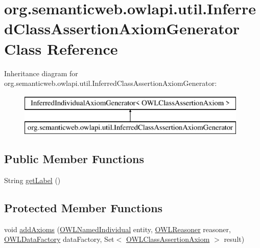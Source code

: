 \hypertarget{classorg_1_1semanticweb_1_1owlapi_1_1util_1_1_inferred_class_assertion_axiom_generator}{\section{org.\-semanticweb.\-owlapi.\-util.\-Inferred\-Class\-Assertion\-Axiom\-Generator Class Reference}
\label{classorg_1_1semanticweb_1_1owlapi_1_1util_1_1_inferred_class_assertion_axiom_generator}
}
Inheritance diagram for org.\-semanticweb.\-owlapi.\-util.\-Inferred\-Class\-Assertion\-Axiom\-Generator\-:\begin{figure}[H]
\begin{center}
\leavevmode
\includegraphics[height=2.000000cm]{classorg_1_1semanticweb_1_1owlapi_1_1util_1_1_inferred_class_assertion_axiom_generator}
\end{center}
\end{figure}
\subsection*{Public Member Functions}
\begin{DoxyCompactItemize}
\item 
String \hyperlink{classorg_1_1semanticweb_1_1owlapi_1_1util_1_1_inferred_class_assertion_axiom_generator_a949955b68387aba2d5710dfb4ddf00c2}{get\-Label} ()
\end{DoxyCompactItemize}
\subsection*{Protected Member Functions}
\begin{DoxyCompactItemize}
\item 
void \hyperlink{classorg_1_1semanticweb_1_1owlapi_1_1util_1_1_inferred_class_assertion_axiom_generator_ade39dfb7653eadb40d99926ed49cfff0}{add\-Axioms} (\hyperlink{interfaceorg_1_1semanticweb_1_1owlapi_1_1model_1_1_o_w_l_named_individual}{O\-W\-L\-Named\-Individual} entity, \hyperlink{interfaceorg_1_1semanticweb_1_1owlapi_1_1reasoner_1_1_o_w_l_reasoner}{O\-W\-L\-Reasoner} reasoner, \hyperlink{interfaceorg_1_1semanticweb_1_1owlapi_1_1model_1_1_o_w_l_data_factory}{O\-W\-L\-Data\-Factory} data\-Factory, Set$<$ \hyperlink{interfaceorg_1_1semanticweb_1_1owlapi_1_1model_1_1_o_w_l_class_assertion_axiom}{O\-W\-L\-Class\-Assertion\-Axiom} $>$ result)
\end{DoxyCompactItemize}


